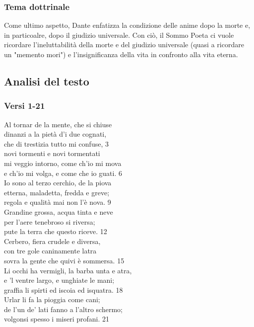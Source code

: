 \documentclass[10pt,a4paper]{article}
\begin{document}
	\subsubsection{Tema dottrinale}
	
	Come ultimo aspetto, Dante enfatizza la condizione delle anime dopo la morte e, in particoalre, dopo il giudizio universale. Con ciò, il Sommo Poeta ci vuole ricordare l'ineluttabilità della morte e del giudizio universale (quasi a ricordare un "memento mori") e l'insignificanza della vita in confronto alla vita eterna.
	
	\subsection{Analisi del testo}
	
	\subsubsection{Versi 1-21}
	
	\begin{estratto}
		Al tornar de la mente, che si chiuse\\
		dinanzi a la pietà d’i due cognati,\\
		che di trestizia tutto mi confuse,		3\\
		
		novi tormenti e novi tormentati\\
		mi veggio intorno, come ch’io mi mova\\
		e ch’io mi volga, e come che io guati.		6\\
		
		Io sono al terzo cerchio, de la piova\\
		etterna, maladetta, fredda e greve;\\
		regola e qualità mai non l’è nova.		9\\
		
		Grandine grossa, acqua tinta e neve\\
		per l’aere tenebroso si riversa;\\
		pute la terra che questo riceve.		12\\
		
		Cerbero, fiera crudele e diversa,\\
		con tre gole caninamente latra\\
		sovra la gente che quivi è sommersa.		15\\
		
		Li occhi ha vermigli, la barba unta e atra,\\
		e ’l ventre largo, e unghiate le mani;\\
		graffia li spirti ed iscoia ed isquatra.		18\\
		
		Urlar li fa la pioggia come cani;\\
		de l’un de’ lati fanno a l’altro schermo;\\
		volgonsi spesso i miseri profani.		21\\
	\end{estratto}
\end{document}
